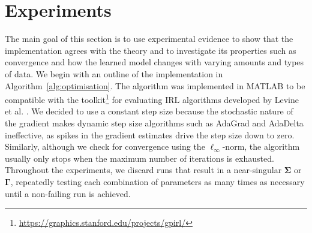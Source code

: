 \documentclass{mpaper}
\begin{document}
\section{Experiments} \label{sec:evaluation}

The main goal of this section is to use experimental evidence to show that the
implementation agrees with the theory and to investigate its properties such as
convergence and how the learned model changes with varying amounts and types of
data. We begin with an outline of the implementation in
Algorithm~\ref{alg:optimisation}. The algorithm was implemented in MATLAB to be
compatible with the
toolkit\footnote{\url{https://graphics.stanford.edu/projects/gpirl/}} for
evaluating IRL algorithms developed by Levine et al.
\cite{DBLP:conf/nips/LevinePK11}. We decided to use a constant step size because
the stochastic nature of the gradient makes dynamic step size algorithms such as
AdaGrad \cite{DBLP:journals/jmlr/DuchiHS11} and AdaDelta
\cite{DBLP:journals/corr/abs-1212-5701} ineffective, as spikes in the gradient
estimates drive the step size down to zero. Similarly, although we check for
convergence using the $\ell_\infty$-norm, the algorithm usually only stops when
the maximum number of iterations is exhausted. Throughout the experiments, we
discard runs that result in a near-singular $\bm\Sigma$ or $\bm\Gamma$,
repeatedly testing each combination of parameters as many times as necessary
until a non-failing run is achieved.
\end{document}
